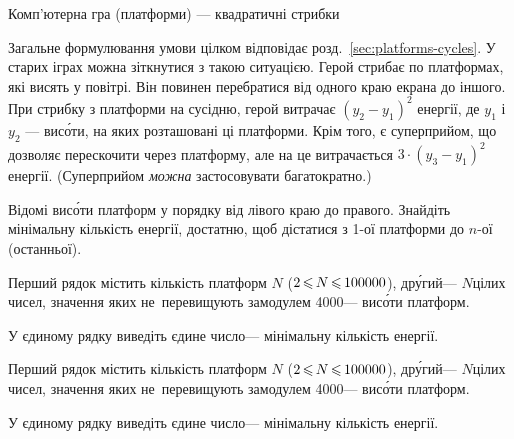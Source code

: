 ﻿\begin{problemAllDefault}{Комп'ютерна гра (платформи) --- квадратичні стрибки}\label{problem:platforms-quadratic}

\ifisART
Загальне формулювання умови цілком відповідає розд.~\ref{sec:platforms-cycles}.
\else
У старих іграх можна зіткнутися з такою ситуацією. Герой стрибає по платформах, які висять у повітрі. 
Він повинен перебратися від одного краю екрана до іншого. При стрибку з платформи на сусідню, 
герой витрачає $(y_2-y_1)^2$ енергії, 
де $y_1$ і $y_2$ --- 
вис\'оти, на яких розташовані ці платформи. 
Крім того, є суперприйом, що дозволяє перескочити через платформу, 
але на це витрачається $3\cdot(y_3-y_1)^2$ енергії.
(Суперприйом \emph{можна} застосовувати багатократно.)

Відомі вис\'оти платформ у порядку від лівого краю до правого. Знайдіть мінімальну кількість енергії, 
достатню, щоб дістатися з 1-ої платформи до $n$-ої (останньої).
\fi


\def\currStatementInputFormatSave{
\InputFile
Перший рядок містить кіль\-кість платформ\hspace{0pt plus 1em} $N$\hspace{0pt plus 1em} ($2\dib{{\<}}N\dib{{\<}}100000$), 
др\'у\-гий\nolinebreak[3] --- $N$\nolinebreak[3] цілих чисел, 
значення яких не~перевищують за\nolinebreak[3] модулем 4000\nolinebreak[3] --- 
вис\'оти платформ.}
\def\currStatementOutputFormatSave{
\OutputFile
У єдиному рядку виведіть єдине число\nolinebreak[3] --- мінімальну кількість енергії.       
}
  
\ifisART
%
{
\myflfigaw{\begin{exampleSimple}{14.5em}{5em}%

\end{exampleSimple}}
\currStatementInputFormatSave
\par
}

\currStatementOutputFormatSave
%
\else
%
\currStatementInputFormatSave
\par
\currStatementOutputFormatSave
\par
\Examples
\begin{example}%

\end{example}
%
\fi

\end{problemAllDefault}